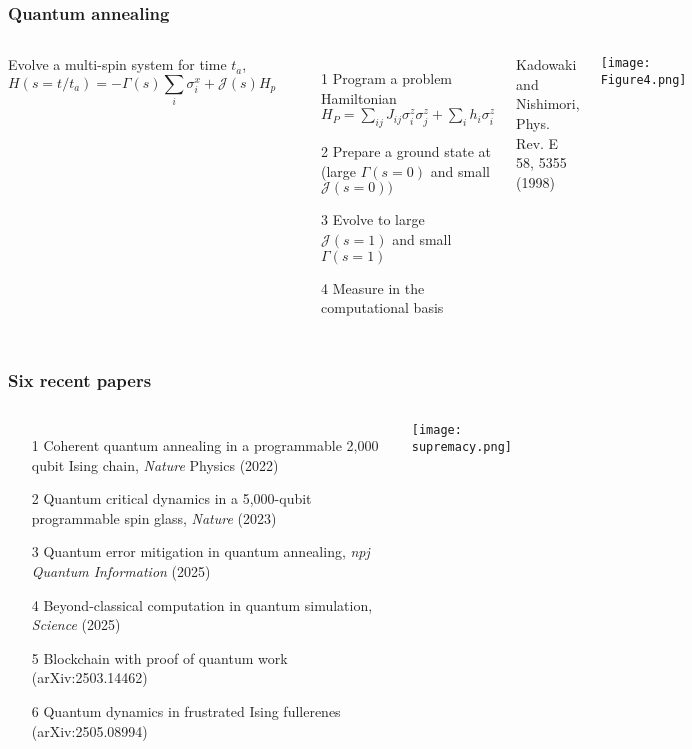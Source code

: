 \documentclass[aspectratio=169,final,11pt,forpublic]{beamer} %
\begin{document}
\begin{frame}\frametitle{\bf Quantum annealing}
  \begin{columns}
    \vspace{-0.2cm}
    Evolve a multi-spin system for time $t_a$, $$H(s=t/t_a) = -\Gamma(s) \sum_i \sigma^x_i + \mathcal{J}(s) H_p \nonumber $$
  \begin{itemize}
    \item[1] Program a problem Hamiltonian $H_P = \sum_{ij} J_{ij}\sigma^z_i \sigma^z_j + \sum_i h_i \sigma^z_i$
    \item[2] Prepare a ground state at (large $\Gamma(s=0)$ and small $\mathcal{J}(s=0))$
    \item[3] Evolve to large $\mathcal{J}(s=1)$ and small $\Gamma(s=1)$
    \item[4] Measure in the computational basis
  \end{itemize}
  Kadowaki and Nishimori, Phys. Rev. E 58, 5355 (1998)
  
  \texttt{[image: Figure4.png]}
\end{columns}
\end{frame}

\begin{frame}\frametitle{\bf Six recent papers}
  \begin{columns}
    \vspace{-0.2cm}
  \begin{itemize}
    \item[1] Coherent quantum annealing in a programmable 2,000 qubit Ising chain, {\it Nature}
      Physics (2022)
    \item[2] Quantum critical dynamics in a 5,000-qubit programmable spin glass, {\it Nature}
      (2023)
    \item[3] Quantum error mitigation in quantum annealing, {\it npj Quantum Information} (2025)
    \item[4] Beyond-classical computation in quantum simulation, {\it Science} (2025)
    \item[5] Blockchain with proof of quantum work (arXiv:2503.14462)
    \item[6] Quantum dynamics in frustrated Ising fullerenes (arXiv:2505.08994)
  \end{itemize}
  \texttt{[image: supremacy.png]}
\end{columns}
\end{frame}
\end{document}
